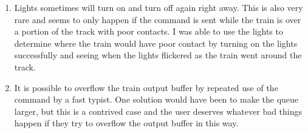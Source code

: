\documentclass[pdftex,10pt,a4paper]{article}
\begin{document}
\begin{enumerate}
\item Lights sometimes will turn on and turn off again right
  away. This is also very rare and seems to only happen if the command
  is sent while the train is over a portion of the track with poor
  contacts. I was able to use the lights to determine where the train
  would have poor contact by turning on the lights successfully and
  seeing when the lights flickered as the train went around the track.

\item It is possible to overflow the train output buffer by repeated
  use of the  command by a fast typist. One solution would
  have been to make the queue larger, but this is a contrived case and
  the user deserves whatever bad things happen if they try to overflow
  the output buffer in this way.

\end{enumerate}
\end{document}

